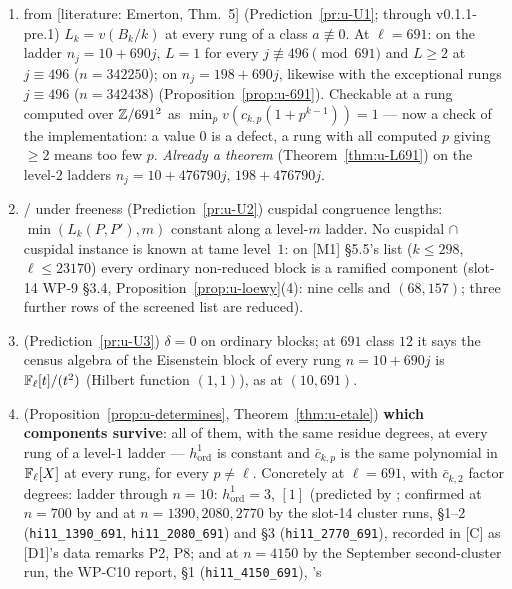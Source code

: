 \documentclass[11pt]{article}
\newcommand{\LIT}[1]{\textsf{[literature: #1]}}   %
\begin{document}
\begin{enumerate}[label=(U\arabic*)]
\item \PROVED{} from \LIT{Emerton, Thm.~5} (Prediction~\ref{pr:u-U1}; \CONJ{} through v0.1.1-pre.1) $L_k=v(B_k/k)$ at every rung of a class $a\not\equiv0$. At $\ell=691$: on the ladder $n_j=10+690j$, $L=1$ for every $j\not\equiv496
  \pmod{691}$ and $L\ge2$ at $j\equiv496$ ($n=342250$); on $n_j=198+690j$, likewise with the exceptional rungs $j\equiv496$ ($n=342438$)
  (Proposition~\ref{prop:u-691}). Checkable at a rung computed over $\mathbb{Z}/691^{2}$ as $\min_{p}v(c_{k,p}(1+p^{k-1}))=1$ --- now a check of the implementation: a value $0$ is a defect, a
  rung with all computed $p$ giving $\ge2$ means too few $p$. \emph{Already a theorem} (Theorem~\ref{thm:u-L691}) on the level-$2$ ladders $n_j=10+476790j$, $198+476790j$.
\item \CONJ{} / \PROVED{} under freeness (Prediction~\ref{pr:u-U2}) cuspidal congruence lengths: $\min(L_k(P,P'),m)$ constant along a level-$m$ ladder. No cuspidal $\cap$ cuspidal instance is known at tame level~$1$: on
  [M1] \S5.5's list ($k\le298$, $\ell\le23170$) every ordinary non-reduced block is a ramified component (slot-14 WP-9 \S3.4,
  Proposition~\ref{prop:u-loewy}(4): nine cells and $(68,157)$; three further rows of the screened list are reduced).
\item \CONJ{} (Prediction~\ref{pr:u-U3}) $\delta=0$ on ordinary blocks; at $691$ class $12$ it says the census algebra of the Eisenstein block of every rung $n=10+690j$ is
  $\mathbb{F}_\ell[t]/(t^{2})$ (Hilbert function $(1,1)$), as at $(10,691)$.
\item \PROVED{} (Proposition~\ref{prop:u-determines}, Theorem~\ref{thm:u-etale}) \textbf{which components survive}: all of them, with the same residue degrees, at every rung
  of a level-$1$ ladder --- $h^{1}_{\mathrm{ord}}$ is constant and $\bar c_{k,p}$ is the same polynomial in $\mathbb{F}_\ell[X]$ at every rung, for every $p\ne\ell$. Concretely at
  $\ell=691$, with $\bar c_{k,2}$ factor degrees: ladder through $n=10$: $h^{1}_{\mathrm{ord}}=3$, $[1]$ (predicted by ; confirmed at $n=700$ by  and at $n=1390,2080,2770$ by the slot-14 cluster runs,
   \S1--2 (\texttt{hi11\_1390\_691}, \texttt{hi11\_2080\_691}) and
   \S3 (\texttt{hi11\_2770\_691}), recorded in [C] as [D1]'s data remarks P2, P8;
  and at $n=4150$ by the September second-cluster run, the WP-C10 report, \S1 (\texttt{hi11\_4150\_691}), 's

\end{enumerate}
\end{document}
